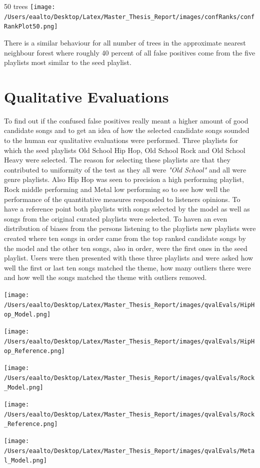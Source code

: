\documentclass[a4paper,11pt]{kth-mag}
\begin{document}
50 trees
\texttt{[image: /Users/eaalto/Desktop/Latex/Master\_Thesis\_Report/images/confRanks/confRankPlot50.png]}

There is a similar behaviour for all number of trees in the approximate nearest neighbour forest where roughly 40 percent of all false positives come from the five playlists most similar to the seed playlist.

\section{Qualitative Evaluations}
To find out if the confused false positives really meant a higher amount of good candidate songs and to get an idea of how the selected candidate songs sounded to the human ear qualitative evaluations were performed. Three playlists for which the seed playlists Old School Hip Hop, Old School Rock and Old School Heavy were selected. The reason for selecting these playlists are that they contributed to uniformity of the test as they all were \textit{"Old School"} and all were genre playlists. Also Hip Hop was seen to precision a high performing playlist, Rock middle performing and Metal low performing so to see how well the performance of the quantitative measures responded to listeners opinions. To have a reference point both playlists with songs selected by the model as well as songs from the original curated playlists were selected. To haven an even distribution of biases from the persons listening to the playlists new playlists were created where ten songs in order came from the top ranked candidate songs by the model and the other ten songs, also in order, were the first ones in the seed playlist. Users were then presented with these three playlists and were asked how well the first or last ten songs matched the theme, how many outliers there were and how well the songs matched the theme with outliers removed.

\texttt{[image: /Users/eaalto/Desktop/Latex/Master\_Thesis\_Report/images/qvalEvals/HipHop\_Model.png]}

\texttt{[image: /Users/eaalto/Desktop/Latex/Master\_Thesis\_Report/images/qvalEvals/HipHop\_Reference.png]}

\texttt{[image: /Users/eaalto/Desktop/Latex/Master\_Thesis\_Report/images/qvalEvals/Rock\_Model.png]}

\texttt{[image: /Users/eaalto/Desktop/Latex/Master\_Thesis\_Report/images/qvalEvals/Rock\_Reference.png]}

\texttt{[image: /Users/eaalto/Desktop/Latex/Master\_Thesis\_Report/images/qvalEvals/Metal\_Model.png]}
\end{document}
